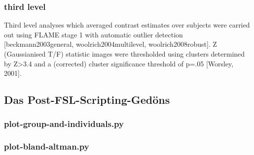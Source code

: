 \documentclass[english]{article}
\begin{document}
\subsubsection{third level}
Third level analyses which averaged contrast estimates over subjects were carried out using FLAME stage 1 with automatic outlier detection [beckmann2003general, woolrich2004multilevel, woolrich2008robust]. Z (Gaussianised T/F) statistic images were thresholded using clusters determined by Z>3.4 and a (corrected) cluster significance threshold of p=.05 [Worsley, 2001].

\subsection{Das Post-FSL-Scripting-Gedöns}
\subsubsection{plot-group-and-individuals.py}

\subsubsection{plot-bland-altman.py}
\end{document}
